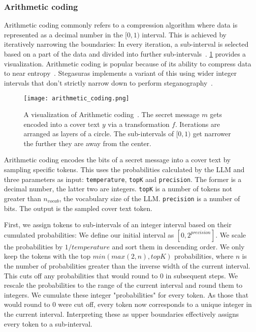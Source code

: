 \subsubsection{Arithmetic coding}
\label{sec:arithmeticCoding}
Arithmetic coding commonly refers to a compression algorithm where data is represented as a decimal number in the $ [0, 1) $ interval. This is achieved by iteratively narrowing the boundaries: In every iteration, a sub-interval is selected based on a part of the data and divided into further sub-intervals~\cite{rissanenArithmeticCoding1979}. \cref{fig:arithmeticCoding} provides a visualization. Arithmetic coding is popular because of its ability to compress data to near entropy~\cite{rissanenArithmeticCoding1979}. Stegasuras implements a variant of this using wider integer intervals that don't strictly narrow down to perform steganography~\cite{zieglerNeuralLinguisticSteganography2019,rubinArithmeticStreamCoding1979}.

\begin{figure}
    \begin{wide}
        \captionsetup{width=\linewidth}
        \texttt{[image: arithmetic\_coding.png]}
		\caption[Arithmetic coding]{A visualization of Arithmetic coding~\cite{zieglerNeuralLinguisticSteganography2019}. The secret message $m$ gets encoded into a cover text $y$ via a transformation $f$. Iterations are arranged as layers of a circle. The sub-intervals of $ [0, 1) $ get narrower the further they are away from the center.}
        \label{fig:arithmeticCoding}
    \end{wide}
\end{figure}

Arithmetic coding encodes the bits of a secret message into a cover text by sampling specific tokens. This uses the probabilities calculated by the \gls{LLM} and three parameters as input: \lstinline|temperature|, \lstinline|topK| and \lstinline|precision|. The former is a decimal number, the latter two are integers. \lstinline|topK| is a number of tokens not greater than $ n_{vocab} $, the vocabulary size of the \gls{LLM}. \lstinline|precision| is a number of bits. The output is the sampled cover text token.

First, we assign tokens to sub-intervals of an integer interval based on their cumulated probabilities: We define our initial interval as $ [0, 2^{precision}] $. We scale the probabilities by $ 1/temperature $ and sort them in descending order. We only keep the tokens with the top $ min(max(2, n), topK) $ probabilities, where $ n $ is the number of probabilities greater than the inverse width of the current interval. This cuts off any probabilities that would round to 0 in subsequent steps. We rescale the probabilities to the range of the current interval and round them to integers. We cumulate these integer "probabilities" for every token. As those that would round to 0 were cut off, every token now corresponds to a unique integer in the current interval. Interpreting these as upper boundaries effectively assigns every token to a sub-interval.

